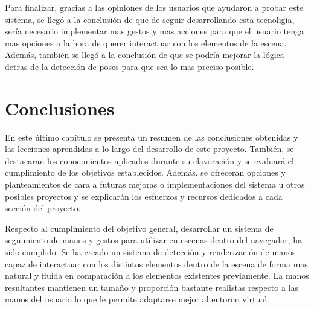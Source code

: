 \documentclass[a4paper, 12pt]{book}
\begin{document}
Para finalizar, gracias a las opiniones de los usuarios que ayudaron a probar este sistema, se llegó a la conclusión de que de seguir desarrollando esta tecnoligía, sería necesario implementar mas gestos y mas acciones para que el usuario tenga mas opciones a la hora de querer interactuar con los elementos de la escena. Además, también se llegó a la conclusión de que se podría mejorar la lógica detras de la detección de poses para que sea lo mas preciso posible.


\cleardoublepage
\chapter{Conclusiones}
\label{chap:conclusiones}
En este último capítulo se presenta un resumen de las conclusiones obtenidas y las lecciones aprendidas a lo largo del desarrollo de este proyecto. También, se destacaran los conocimientos aplicados durante su elavoración y se evaluará el cumplimiento de los objetivos establecidos. Además, se ofreceran opciones y planteamientos de cara a futuras mejoras o implementaciones del sistema u otros posibles proyectos y se explicarán los esfuerzos y recursos dedicados a cada sección del proyecto.

Respecto al cumplimiento del objetivo general, desarrollar un sistema de seguimiento de manos y gestos para utilizar en escenas dentro del navegador, ha sido cumplido. Se ha creado un sistema de detección y renderización de manos capaz de interactuar con los distintos elementos dentro de la escena de forma mas natural y fluida en comparación a los elementos existentes previamente. La manos resultantes mantienen un tamaño y proporción bastante realistas respecto a las manos del usuario lo que le permite adaptarse mejor al entorno virtual.
\end{document}
